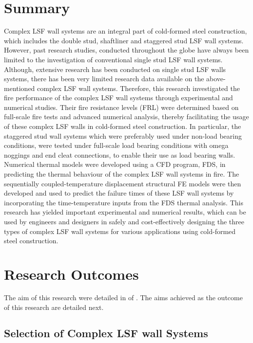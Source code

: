 \section{Summary}

Complex LSF wall systems are an integral part of cold-formed steel construction, which includes the double stud, shaftliner and staggered stud LSF wall systems. However, past research studies, conducted throughout the globe have always been limited to the investigation of conventional single stud LSF wall systems. Although, extensive research has been conducted on single stud LSF walls systems, there has been very limited research data available on the above-mentioned complex LSF wall systems. Therefore, this research investigated the fire performance of the complex LSF wall systems through experimental and numerical studies. Their fire resistance levels (FRL) were determined based on full-scale fire tests and advanced numerical analysis, thereby facilitating the usage of these complex LSF walls in cold-formed steel construction. In particular, the staggered stud wall systems which were preferably used under non-load bearing conditions, were tested under full-scale load bearing conditions with omega noggings and end cleat connections, to enable their use as load bearing walls. Numerical thermal models were developed using a CFD program, FDS, in predicting the thermal behaviour of the complex LSF wall systems in fire. The sequentially coupled-temperature displacement structural FE models were then developed and used to predict the failure times of these LSF wall systems by incorporating the time-temperature inputs from the FDS thermal analysis. This research has yielded important experimental and numerical results, which can be used by engineers and designers in safely and cost-effectively designing the three types of complex LSF wall systems for various applications using cold-formed steel construction.

\section{Research Outcomes}

The aim of this research were detailed in  of . The aims achieved as the outcome of this research are detailed next.

\subsection{Selection of Complex LSF wall Systems}

